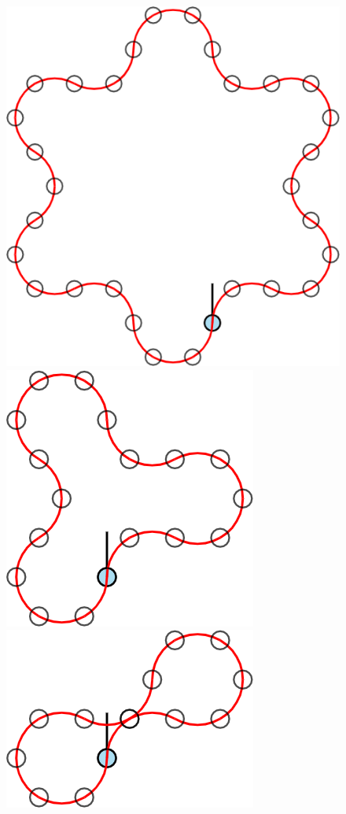 \documentclass{article}
\begin{document}
\begin{figure}[ht!]
  \includegraphics[scale=0.12]{assets/069_problem_robot_walks/6-robot_2_3.png}
  \includegraphics[scale=0.12]{assets/069_problem_robot_walks/6-robot_2_4.png}
  \includegraphics[scale=0.12]{assets/069_problem_robot_walks/6-robot_2_5.png}

\end{figure}
\end{document}
